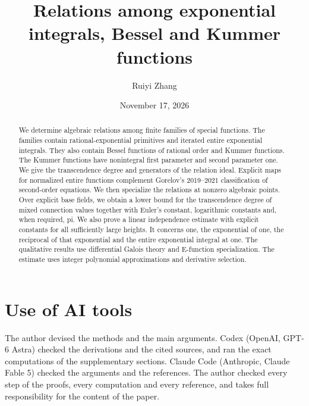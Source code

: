 \documentclass{amsart}
\begin{document}
\title[Exponential integrals, Bessel and Kummer functions]{Relations among exponential integrals, Bessel and Kummer functions}
\author{Ruiyi Zhang}
\address{Independent Researcher, Columbia, Maryland, USA}
\date{November 17, 2026}

\begin{abstract}
We determine algebraic relations among finite families of special functions.
The families contain rational-exponential primitives and iterated entire exponential integrals.
They also contain Bessel functions of rational order and Kummer functions.
The Kummer functions have nonintegral first parameter and second parameter one.
We give the transcendence degree and generators of the relation ideal.
Explicit maps for normalized entire functions complement Gorelov's 2019--2021 classification of second-order equations.
We then specialize the relations at nonzero algebraic points.
Over explicit base fields, we obtain a lower bound for the transcendence degree of mixed
connection values together with Euler's constant, logarithmic constants and,
when required, pi.
We also prove a linear independence estimate with explicit constants for all sufficiently large heights.
It concerns one, the exponential of one, the reciprocal of that exponential and the entire exponential integral at one.
The qualitative results use differential Galois theory and E-function specialization.
The estimate uses integer polynomial approximations and derivative selection.
\end{abstract}

\maketitle









\section*{Use of AI tools}
The author devised the methods and the main arguments. Codex (OpenAI, GPT-6 Astra)
checked the derivations and the cited sources, and ran the exact computations of the
supplementary sections. Claude Code (Anthropic, Claude Fable 5) checked the arguments
and the references. The author checked every step of the proofs, every computation and
every reference, and takes full responsibility for the content of the paper.
\end{document}
